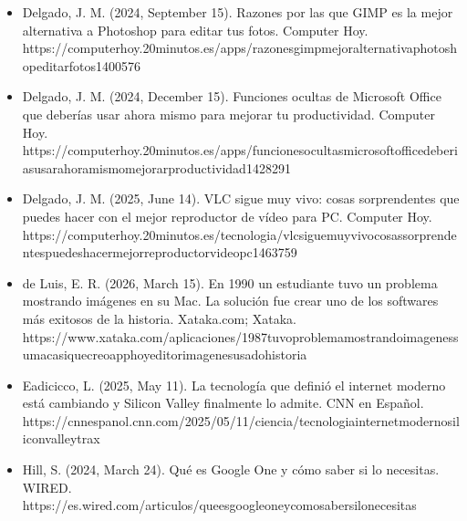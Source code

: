 \documentclass[letterpaper,10pt,spanish]{sphinxmanual}
\begin{document}
\begin{itemize}
\item {} 
\sphinxAtStartPar
Delgado, J. M. (2024, September 15). Razones por las que GIMP es la mejor alternativa a Photoshop para editar tus fotos. Computer Hoy. https://computerhoy.20minutos.es/apps/razones\sphinxhyphen{}gimp\sphinxhyphen{}mejor\sphinxhyphen{}alternativa\sphinxhyphen{}photoshop\sphinxhyphen{}editar\sphinxhyphen{}fotos\sphinxhyphen{}1400576

\item {} 
\sphinxAtStartPar
Delgado, J. M. (2024, December 15). Funciones ocultas de Microsoft Office que deberías usar ahora mismo para mejorar tu productividad. Computer Hoy. https://computerhoy.20minutos.es/apps/funciones\sphinxhyphen{}ocultas\sphinxhyphen{}microsoft\sphinxhyphen{}office\sphinxhyphen{}deberias\sphinxhyphen{}usar\sphinxhyphen{}ahora\sphinxhyphen{}mismo\sphinxhyphen{}mejorar\sphinxhyphen{}productividad\sphinxhyphen{}1428291

\item {} 
\sphinxAtStartPar
Delgado, J. M. (2025, June 14). VLC sigue muy vivo: cosas sorprendentes que puedes hacer con el mejor reproductor de vídeo para PC. Computer Hoy. https://computerhoy.20minutos.es/tecnologia/vlc\sphinxhyphen{}sigue\sphinxhyphen{}muy\sphinxhyphen{}vivo\sphinxhyphen{}cosas\sphinxhyphen{}sorprendentes\sphinxhyphen{}puedes\sphinxhyphen{}hacer\sphinxhyphen{}mejor\sphinxhyphen{}reproductor\sphinxhyphen{}video\sphinxhyphen{}pc\sphinxhyphen{}1463759

\item {} 
\sphinxAtStartPar
de Luis, E. R. (2026, March 15). En 1990 un estudiante tuvo un problema mostrando imágenes en su Mac. La solución fue crear uno de los softwares más exitosos de la historia. Xataka.com; Xataka. https://www.xataka.com/aplicaciones/1987\sphinxhyphen{}tuvo\sphinxhyphen{}problema\sphinxhyphen{}mostrando\sphinxhyphen{}imagenes\sphinxhyphen{}su\sphinxhyphen{}mac\sphinxhyphen{}asi\sphinxhyphen{}que\sphinxhyphen{}creo\sphinxhyphen{}app\sphinxhyphen{}hoy\sphinxhyphen{}editor\sphinxhyphen{}imagenes\sphinxhyphen{}usado\sphinxhyphen{}historia

\item {} 
\sphinxAtStartPar
Eadicicco, L. (2025, May 11). La tecnologí­a que definió el internet moderno está cambiando y Silicon Valley finalmente lo admite. CNN en Español. https://cnnespanol.cnn.com/2025/05/11/ciencia/tecnologia\sphinxhyphen{}internet\sphinxhyphen{}moderno\sphinxhyphen{}silicon\sphinxhyphen{}valley\sphinxhyphen{}trax

\item {} 
\sphinxAtStartPar
Hill, S. (2024, March 24). Qué es Google One y cómo saber si lo necesitas. WIRED. https://es.wired.com/articulos/que\sphinxhyphen{}es\sphinxhyphen{}google\sphinxhyphen{}one\sphinxhyphen{}y\sphinxhyphen{}como\sphinxhyphen{}saber\sphinxhyphen{}si\sphinxhyphen{}lo\sphinxhyphen{}necesitas


\end{itemize}
\end{document}
